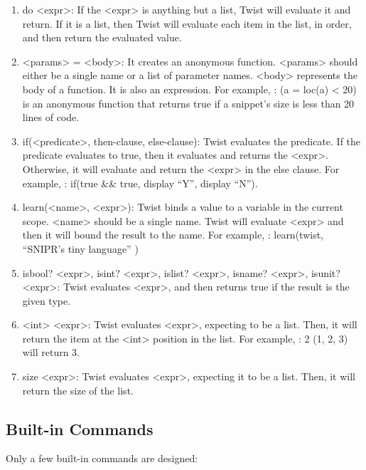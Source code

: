\begin{enumerate}
	\item do <expr>: If the <expr> is anything but a list, Twist will evaluate it and 
	return. If it is a list, then Twist will evaluate each item in the list, in order, 
	and then return the evaluated value.
	
	\item <params> = <body>: It creates an anonymous function. <params> should either be 
	a single name or a list of parameter names. <body> represents the body of a 
	function. It is also an expression. For example, : (a = loc(a) < 20) is an 
	anonymous function that returns true if a snippet's size is less than 20 lines of 
	code. 
	
	\item if(<predicate>, then-clause, else-clause): Twist evaluates the predicate. If 
	the predicate evaluates to true, then it evaluates and returns the <expr>. Otherwise, 
	it will evaluate and return the <expr> in the else clause. For example, : if(true 
	\&\& true, display ``Y'', display ``N'').
	
	\item learn(<name>, <expr>): Twist binds a value to a variable in the current scope. 
	<name> should be a single name. Twist will evaluate <expr> and then it will bound the 
	result to the name. For example, : learn(twist, ``SNIPR's tiny language'' )
   
	\item isbool? <expr>, isint? <expr>, islist? <expr>, isname? <expr>, isunit? <expr>: Twist 
	evaluates <expr>, and then returns true if the result is the given type.
 	
	\item <int> <expr>: Twist evaluates <expr>, expecting to be a list. Then, it will 
	return the item at the <int> position in the list. For example, : 2 (1, 2, 3) will 
	return 3.
	
	\item size <expr>: Twist evaluates <expr>, expecting it to be a list. Then, it will 
	return the size of the list.
\end{enumerate}

\subsection{Built-in Commands}
\label{sec:retargetingops}

Only a few built-in commands are designed:

